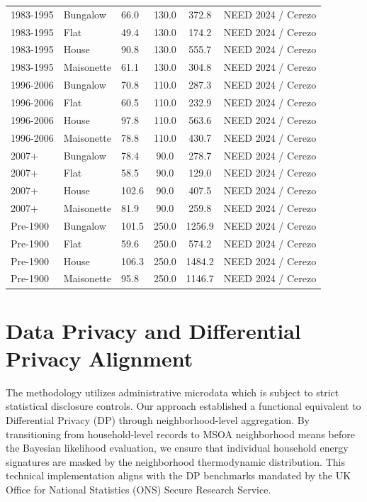 \documentclass[11pt, a4paper]{article}
\begin{document}
\begin{longtable}{lllccl}
1983-1995 & Bungalow & 66.0 & 130.0 & 372.8 & NEED 2024 / Cerezo \\
1983-1995 & Flat & 49.4 & 130.0 & 174.2 & NEED 2024 / Cerezo \\
1983-1995 & House & 90.8 & 130.0 & 555.7 & NEED 2024 / Cerezo \\
1983-1995 & Maisonette & 61.1 & 130.0 & 304.8 & NEED 2024 / Cerezo \\
1996-2006 & Bungalow & 70.8 & 110.0 & 287.3 & NEED 2024 / Cerezo \\
1996-2006 & Flat & 60.5 & 110.0 & 232.9 & NEED 2024 / Cerezo \\
1996-2006 & House & 97.8 & 110.0 & 563.6 & NEED 2024 / Cerezo \\
1996-2006 & Maisonette & 78.8 & 110.0 & 430.7 & NEED 2024 / Cerezo \\
2007+ & Bungalow & 78.4 & 90.0 & 278.7 & NEED 2024 / Cerezo \\
2007+ & Flat & 58.5 & 90.0 & 129.0 & NEED 2024 / Cerezo \\
2007+ & House & 102.6 & 90.0 & 407.5 & NEED 2024 / Cerezo \\
2007+ & Maisonette & 81.9 & 90.0 & 259.8 & NEED 2024 / Cerezo \\
Pre-1900 & Bungalow & 101.5 & 250.0 & 1256.9 & NEED 2024 / Cerezo \\
Pre-1900 & Flat & 59.6 & 250.0 & 574.2 & NEED 2024 / Cerezo \\
Pre-1900 & House & 106.3 & 250.0 & 1484.2 & NEED 2024 / Cerezo \\
Pre-1900 & Maisonette & 95.8 & 250.0 & 1146.7 & NEED 2024 / Cerezo \\
\end{longtable}

\newpage
\section{Data Privacy and Differential Privacy Alignment}

The methodology utilizes administrative microdata which is subject to strict 
statistical disclosure controls. Our approach established a functional 
equivalent to Differential Privacy (DP) through neighborhood-level 
aggregation. By transitioning from household-level records to MSOA 
neighborhood means before the Bayesian likelihood evaluation, we ensure that 
individual household energy signatures are masked by the neighborhood 
thermodynamic distribution. This technical implementation aligns with the 
DP benchmarks mandated by the UK Office for National Statistics (ONS) Secure 
Research Service.
\end{document}
